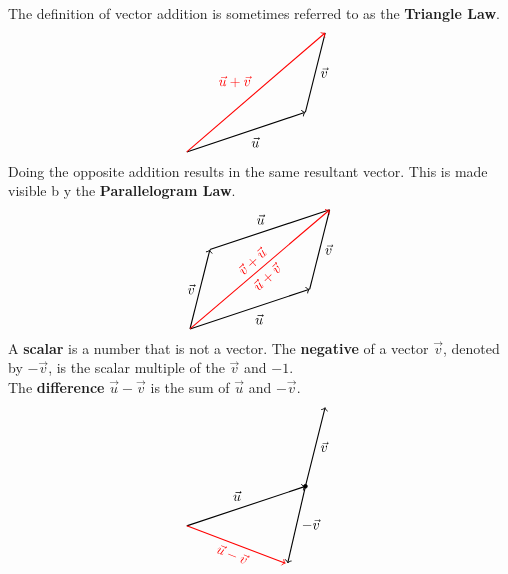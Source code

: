 \documentclass[../Calculus_\Roman{3}]{subfiles}
\begin{document}
				The definition of vector addition is sometimes referred to as the \textbf{Triangle Law}.
				\[\begin{tikzpicture}
					\draw[thick, ->] (0, 0) -- node[anchor = north west]{$\vec{u}$} ++ (3, 1);
					\draw[thick] (3, 1) -- node[anchor = west]{$\vec{v}$} ++ (0.5, 2);
					\draw[thick, ->, color = red] (0, 0) -- node[anchor = south east]{$\vec{u} + \vec{v}$} ++ (3.5, 3); 
				\end{tikzpicture}\]
				Doing the opposite addition results in the same resultant vector. This is made visible b y the \textbf{Parallelogram Law}.
				\[\begin{tikzpicture}
					\draw[thick, ->] (0, 0) -- node[anchor = north west]{$\vec{u}$} ++ (3, 1);
					\draw[thick] (3, 1) -- node[anchor = west]{$\vec{v}$} ++ (0.5, 2);
					\draw[thick, ->] (0, 0) -- node[anchor = east]{$\vec{v}$} (0.5, 2);
					\draw[thick] (0.5, 2) -- node[anchor = south east]{$\vec{u}$} ++ (3, 1);
					\draw[thick, ->, color = red] (0, 0) -- node[anchor = south, rotate = 43]{$\vec{v} + \vec{u}$} node[anchor = north, rotate = 43]{$\vec{u} + \vec{v}$} ++ (3.5, 3);
				\end{tikzpicture}\]
				A \textbf{scalar} is a number that is not a vector.
				The \textbf{negative} of a vector $\vec{v}$, denoted by $-\vec{v}$, is the scalar multiple of the $\vec{v}$ and $-1$. \\
				The \textbf{difference} $\vec{u} - \vec{v}$ is the sum of $\vec{u}$ and $-\vec{v}$.
				\[\begin{tikzpicture}
					\draw[thick, ->] (0, 0) -- node[anchor = south east]{$\vec{u}$} ++ (3, 1);
					\filldraw (3, 1) circle (0.5mm);
					\draw[thick, ->] (3, 1) -- node[anchor = west]{$\vec{v}$} ++ (0.5, 2);
					\draw[thick, ->] (3, 1) -- node[anchor = west]{$-\vec{v}$} ++(-0.45, -1.95);
					\draw[thick, ->, color = red] (0, 0) -- node[anchor = north, rotate = -22]{$\vec{u} - \vec{v}$} (2.5, -0.95);
				\end{tikzpicture}\]
\end{document}
